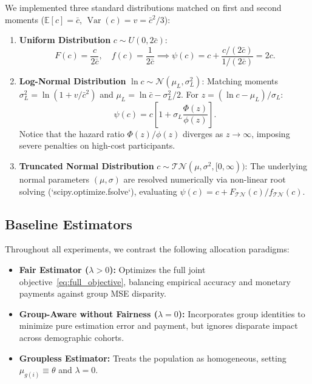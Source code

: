 \documentclass[11pt,a4paper]{article}
\newcommand{\E}{\mathbb{E}}
\newcommand{\Var}{\operatorname{Var}}
\begin{document}
We implemented three standard distributions matched on first and second moments ($\E[c] = \bar{c}$, $\Var(c) = v = \bar{c}^2/3$):
\begin{enumerate}
    \item \textbf{Uniform Distribution} $c \sim U(0, 2\bar{c})$:
    \begin{equation}
        F(c) = \frac{c}{2\bar{c}}, \quad f(c) = \frac{1}{2\bar{c}} \implies \psi(c) = c + \frac{c/(2\bar{c})}{1/(2\bar{c})} = 2c.
    \end{equation}
    \item \textbf{Log-Normal Distribution} $\ln c \sim \mathcal{N}(\mu_L, \sigma_L^2)$: Matching moments $\sigma_L^2 = \ln(1 + v/\bar{c}^2)$ and $\mu_L = \ln \bar{c} - \sigma_L^2/2$. For $z = (\ln c - \mu_L)/\sigma_L$:
    \begin{equation}
        \psi(c) = c \left[ 1 + \sigma_L \frac{\Phi(z)}{\phi(z)} \right].
    \end{equation}
    Notice that the hazard ratio $\Phi(z)/\phi(z)$ diverges as $z \to \infty$, imposing severe penalties on high-cost participants.
    \item \textbf{Truncated Normal Distribution} $c \sim \mathcal{TN}(\mu, \sigma^2, [0, \infty))$: The underlying normal parameters $(\mu, \sigma)$ are resolved numerically via non-linear root solving (`scipy.optimize.fsolve`), evaluating $\psi(c) = c + F_{\mathcal{TN}}(c)/f_{\mathcal{TN}}(c)$.
\end{enumerate}

\subsection{Baseline Estimators}

Throughout all experiments, we contrast the following allocation paradigms:
\begin{itemize}[leftmargin=1.5em]
    \item \textbf{Fair Estimator ($\lambda > 0$):} Optimizes the full joint objective~\eqref{eq:full_objective}, balancing empirical accuracy and monetary payments against group MSE disparity.
    \item \textbf{Group-Aware without Fairness ($\lambda = 0$):} Incorporates group identities to minimize pure estimation error and payment, but ignores disparate impact across demographic cohorts.
    \item \textbf{Groupless Estimator:} Treats the population as homogeneous, setting $\mu_{g(i)} \equiv \theta$ and $\lambda = 0$. 
\end{itemize}
\end{document}
